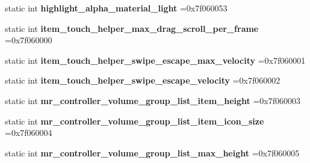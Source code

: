 \begin{DoxyCompactItemize}
\mbox{\label{classandroid_1_1support_1_1design_1_1R_1_1dimen_a84b2cf035a2229278e1a4ab3cea5fd7d}} 
static int {\bfseries highlight\+\_\+alpha\+\_\+material\+\_\+light} =0x7f060053
\item 
\mbox{\label{classandroid_1_1support_1_1design_1_1R_1_1dimen_aed75ee6c8190291dfb66b8f60de151c1}} 
static int {\bfseries item\+\_\+touch\+\_\+helper\+\_\+max\+\_\+drag\+\_\+scroll\+\_\+per\+\_\+frame} =0x7f060000
\item 
\mbox{\label{classandroid_1_1support_1_1design_1_1R_1_1dimen_a3cb8bc1a2a28221d3d5f249e2d07d589}} 
static int {\bfseries item\+\_\+touch\+\_\+helper\+\_\+swipe\+\_\+escape\+\_\+max\+\_\+velocity} =0x7f060001
\item 
\mbox{\label{classandroid_1_1support_1_1design_1_1R_1_1dimen_aba9418b4766b313a68392d5b926e09bc}} 
static int {\bfseries item\+\_\+touch\+\_\+helper\+\_\+swipe\+\_\+escape\+\_\+velocity} =0x7f060002
\item 
\mbox{\label{classandroid_1_1support_1_1design_1_1R_1_1dimen_ac32491b3599cd00943517dba8f4d4bc6}} 
static int {\bfseries mr\+\_\+controller\+\_\+volume\+\_\+group\+\_\+list\+\_\+item\+\_\+height} =0x7f060003
\item 
\mbox{\label{classandroid_1_1support_1_1design_1_1R_1_1dimen_ad413499575e8c625be01cafbf972a179}} 
static int {\bfseries mr\+\_\+controller\+\_\+volume\+\_\+group\+\_\+list\+\_\+item\+\_\+icon\+\_\+size} =0x7f060004
\item 
\mbox{\label{classandroid_1_1support_1_1design_1_1R_1_1dimen_a1f292ab7b654aedc3d683abb3323a3a3}} 
static int {\bfseries mr\+\_\+controller\+\_\+volume\+\_\+group\+\_\+list\+\_\+max\+\_\+height} =0x7f060005
\item 
\mbox{\label{classandroid_1_1support_1_1design_1_1R_1_1dimen_a23b5f24749271d779cfd366febcd2743}} 

\end{DoxyCompactItemize}
